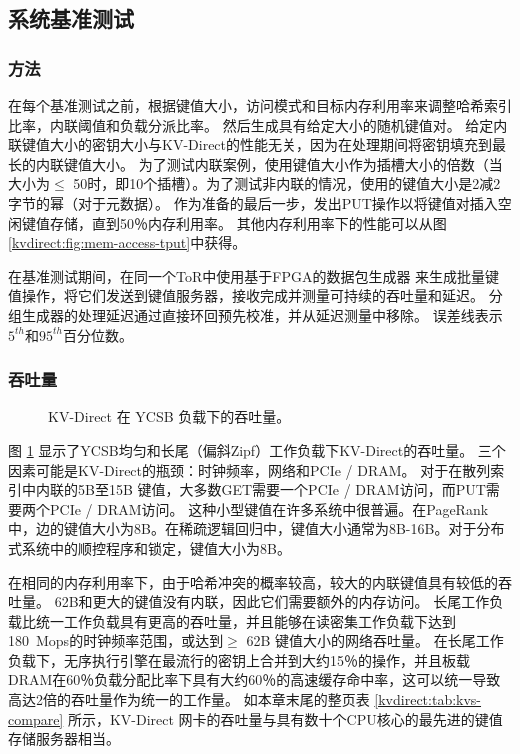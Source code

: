 \subsection{系统基准测试}
\label{kvdirect:sec:system-benchmark}

\subsubsection{方法}

在每个基准测试之前，根据键值大小，访问模式和目标内存利用率来调整哈希索引比率，内联阈值和负载分派比率。
然后生成具有给定大小的随机键值对。
给定内联键值大小的密钥大小与KV-Direct的性能无关，因为在处理期间将密钥填充到最长的内联键值大小。
为了测试内联案例，使用键值大小作为插槽大小的倍数（当大小为$ \leq $ 50时，即10个插槽）。为了测试非内联的情况，使用的键值大小是2减2字节的幂（对于元数据）。
作为准备的最后一步，发出PUT操作以将键值对插入空闲键值存储，直到50％内存利用率。
其他内存利用率下的性能可以从图 \ref {kvdirect:fig:mem-access-tput}中获得。

在基准测试期间，在同一个ToR中使用基于FPGA的数据包生成器 \cite {li2016clicknp}来生成批量键值操作，将它们发送到键值服务器，接收完成并测量可持续的吞吐量和延迟。
分组生成器的处理延迟通过直接环回预先校准，并从延迟测量中移除。
误差线表示$ 5^{th} $和$ 95^{th} $百分位数。

\subsubsection{吞吐量}

\begin{figure}[t]
\centering
{}
\caption{KV-Direct 在 YCSB 负载下的吞吐量。}
\label{kvdirect:fig:ycsb-tput}

\end{figure}

图 \ref {kvdirect:fig:ycsb-tput} 显示了YCSB均匀和长尾（偏斜Zipf）工作负载下KV-Direct的吞吐量。
三个因素可能是KV-Direct的瓶颈：时钟频率，网络和PCIe / DRAM。
对于在散列索引中内联的5B至15B 键值，大多数GET需要一个PCIe / DRAM访问，而PUT需要两个PCIe / DRAM访问。
这种小型键值在许多系统中很普遍。在PageRank中，边的键值大小为8B。在稀疏逻辑回归中，键值大小通常为8B-16B。对于分布式系统中的顺控程序和锁定，键值大小为8B。

在相同的内存利用率下，由于哈希冲突的概率较高，较大的内联键值具有较低的吞吐量。
62B和更大的键值没有内联，因此它们需要额外的内存访问。
长尾工作负载比统一工作负载具有更高的吞吐量，并且能够在读密集工作负载下达到180~Mops的时钟频率范围，或达到$ \geq $ 62B 键值大小的网络吞吐量。
在长尾工作负载下，无序执行引擎在最流行的密钥上合并到大约15％的操作，并且板载DRAM在60％负载分配比率下具有大约60％的高速缓存命中率，这可以统一导致高达2倍的吞吐量作为统一的工作量。
如本章末尾的整页表 \ref {kvdirect:tab:kvs-compare} 所示，KV-Direct 网卡的吞吐量与具有数十个CPU核心的最先进的键值存储服务器相当。

